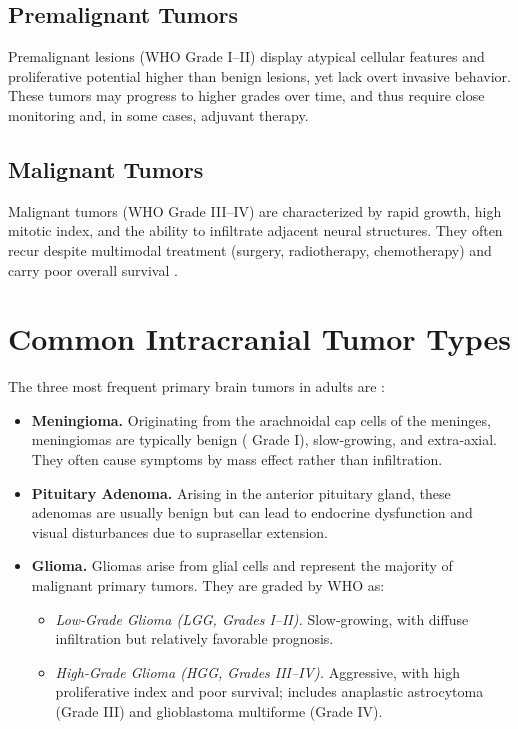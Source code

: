\subsection{Premalignant Tumors}
Premalignant lesions (WHO Grade I–II) display atypical cellular features and proliferative potential higher than benign lesions, yet lack overt invasive behavior. These tumors may progress to higher grades over time, and thus require close monitoring and, in some cases, adjuvant therapy.

\subsection{Malignant Tumors}
Malignant tumors (WHO Grade III–IV) are characterized by rapid growth, high mitotic index, and the ability to infiltrate adjacent neural structures. They often recur despite multimodal treatment (surgery, radiotherapy, chemotherapy) and carry poor overall survival \cite{ref8}.

\section{Common Intracranial Tumor Types}
\label{sec:common-tumor-types}

The three most frequent primary brain tumors in adults are \cite{naser2020lgmi}:

\begin{itemize}
      \item \textbf{Meningioma.}
            Originating from the arachnoidal cap cells of the meninges, meningiomas are typically benign ( Grade I), slow‐growing, and extra‐axial. They often cause symptoms by mass effect rather than infiltration.

      \item \textbf{Pituitary Adenoma.}
            Arising in the anterior pituitary gland, these adenomas are usually benign but can lead to endocrine dysfunction and visual disturbances due to suprasellar extension.

      \item \textbf{Glioma.}
            Gliomas arise from glial cells and represent the majority of malignant primary  tumors. They are graded by WHO as:
            \begin{itemize}
                  \item \emph{Low-Grade Glioma (LGG, Grades I–II).} Slow‐growing, with diffuse infiltration but relatively favorable prognosis.
                  \item \emph{High-Grade Glioma (HGG, Grades III–IV).} Aggressive, with high proliferative index and poor survival; includes anaplastic astrocytoma (Grade III) and glioblastoma multiforme (Grade IV).
            \end{itemize}
\end{itemize}

